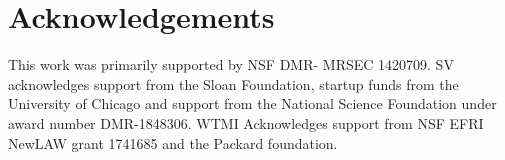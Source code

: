 \documentclass[
 preprint,
 preprintnumbers,
 amsmath,amssymb,
 aps,
 pre,
 longbibliography,
 superscriptaddress,
 10pt, twocolumn
]{revtex4-1}
\begin{document}



\section*{Acknowledgements}
This work was primarily supported by NSF DMR- MRSEC 1420709. SV acknowledges support from the Sloan Foundation, startup funds from the University of Chicago and support from the National Science Foundation under award number DMR-1848306. WTMI Acknowledges support from NSF EFRI NewLAW grant 1741685 and the Packard foundation. 


\end{document}
